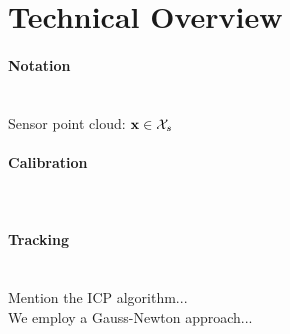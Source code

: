 \section{Technical Overview}

\paragraph{Notation} \\
Sensor point cloud: $\mathbf{x} \in \mathcal{X}_{s}$ 

\paragraph{Calibration} \\

\paragraph{Tracking} \\
Mention the ICP algorithm... \\
We employ a Gauss-Newton approach... \\
